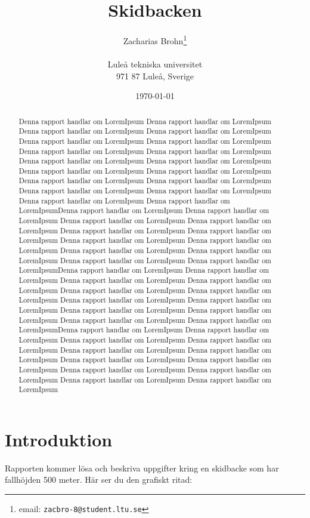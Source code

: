 \documentclass[a4paper,12pt]{article}
\title{Skidbacken}
\author{Zacharias Brohn\thanks{email:
        \texttt{zacbro-8@student.ltu.se}}\\  
        ~ \\
        Luleå tekniska universitet \\ 
        971 87 Luleå, Sverige}
\date{\today}
\begin{document}
\linenumbers %

\maketitle

\begin{abstract}
  Denna rapport handlar om LoremIpsum
  Denna rapport handlar om LoremIpsum  Denna rapport handlar om LoremIpsum  Denna rapport handlar om LoremIpsum  Denna rapport handlar om LoremIpsum  Denna rapport handlar om LoremIpsum  Denna rapport handlar om LoremIpsum  Denna rapport handlar om LoremIpsum  Denna rapport handlar om LoremIpsum  Denna rapport handlar om LoremIpsum  Denna rapport handlar om LoremIpsum  Denna rapport handlar om LoremIpsum  Denna rapport handlar om LoremIpsum  Denna rapport handlar om LoremIpsum  Denna rapport handlar om LoremIpsum  Denna rapport handlar om LoremIpsum  Denna rapport handlar om LoremIpsum  Denna rapport handlar om LoremIpsumDenna rapport handlar om LoremIpsum  Denna rapport handlar om LoremIpsum  Denna rapport handlar om LoremIpsum  Denna rapport handlar om LoremIpsum  Denna rapport handlar om LoremIpsum  Denna rapport handlar om LoremIpsum  Denna rapport handlar om LoremIpsum  Denna rapport handlar om LoremIpsum  Denna rapport handlar om LoremIpsum  Denna rapport handlar om LoremIpsum  Denna rapport handlar om LoremIpsum  Denna rapport handlar om LoremIpsumDenna rapport handlar om LoremIpsum  Denna rapport handlar om LoremIpsum  Denna rapport handlar om LoremIpsum  Denna rapport handlar om LoremIpsum  Denna rapport handlar om LoremIpsum  Denna rapport handlar om LoremIpsum  Denna rapport handlar om LoremIpsum  Denna rapport handlar om LoremIpsum  Denna rapport handlar om LoremIpsum  Denna rapport handlar om LoremIpsum  Denna rapport handlar om LoremIpsum  Denna rapport handlar om LoremIpsumDenna rapport handlar om LoremIpsum  Denna rapport handlar om LoremIpsum  Denna rapport handlar om LoremIpsum  Denna rapport handlar om LoremIpsum  Denna rapport handlar om LoremIpsum  Denna rapport handlar om LoremIpsum  Denna rapport handlar om LoremIpsum  Denna rapport handlar om LoremIpsum  Denna rapport handlar om LoremIpsum  Denna rapport handlar om LoremIpsum  Denna rapport handlar om LoremIpsum  Denna rapport handlar om LoremIpsum
\end{abstract}
\section{Introduktion}
\label{sec:introduktion}
Rapporten kommer lösa och beskriva uppgifter kring en skidbacke som har fallhöjden 500 meter. Här ser du den grafiskt ritad:
\end{document}
